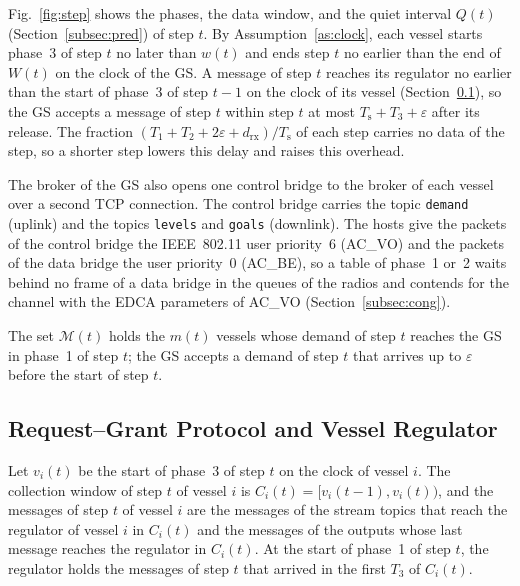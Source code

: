 Fig.~\ref{fig:step} shows the phases, the data window, and the quiet interval $Q(t)$ (Section~\ref{subsec:pred}) of step $t$. By Assumption~\ref{as:clock}, each vessel starts phase~3 of step $t$ no later than $w(t)$ and ends step $t$ no earlier than the end of $W(t)$ on the clock of the GS. A message of step $t$ reaches its regulator no earlier than the start of phase~3 of step $t-1$ on the clock of its vessel (Section~\ref{subsec:protocol}), so the GS accepts a message of step $t$ within step $t$ at most $T_{\mathrm{s}} + T_3 + \varepsilon$ after its release. The fraction $(T_1 + T_2 + 2\varepsilon + d_{\mathrm{rx}})/T_{\mathrm{s}}$ of each step carries no data of the step, so a shorter step lowers this delay and raises this overhead.

The broker of the GS also opens one control bridge to the broker of each vessel over a second TCP connection. The control bridge carries the topic \texttt{demand} (uplink) and the topics \texttt{levels} and \texttt{goals} (downlink). The hosts give the packets of the control bridge the IEEE~802.11 user priority~6 (AC\_VO) and the packets of the data bridge the user priority~0 (AC\_BE), so a table of phase~1 or~2 waits behind no frame of a data bridge in the queues of the radios and contends for the channel with the EDCA parameters of AC\_VO (Section~\ref{subsec:cong}).

The set $\mathcal{M}(t)$ holds the $m(t)$ vessels whose demand of step $t$ reaches the GS in phase~1 of step $t$; the GS accepts a demand of step $t$ that arrives up to $\varepsilon$ before the start of step $t$.

\subsection{Request--Grant Protocol and Vessel Regulator}\label{subsec:protocol}

Let $v_i(t)$ be the start of phase~3 of step $t$ on the clock of vessel $i$. The collection window of step $t$ of vessel $i$ is $C_i(t) = [v_i(t-1), v_i(t))$, and the messages of step $t$ of vessel $i$ are the messages of the stream topics that reach the regulator of vessel $i$ in $C_i(t)$ and the messages of the outputs whose last message reaches the regulator in $C_i(t)$. At the start of phase~1 of step $t$, the regulator holds the messages of step $t$ that arrived in the first $T_3$ of $C_i(t)$.

